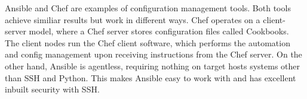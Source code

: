 Ansible and Chef are examples of configuration management tools. Both tools achieve similiar results but work in different ways. Chef operates on a client-server model, where a Chef server stores configuration files called Cookbooks. The client nodes run the Chef client software, which performs the automation and config management upon receiving instructions from the Chef server. On the other hand, Ansible is agentless, requiring nothing on target hosts systems other than SSH and Python. This makes Ansible easy to work with and has excellent inbuilt security with SSH.
